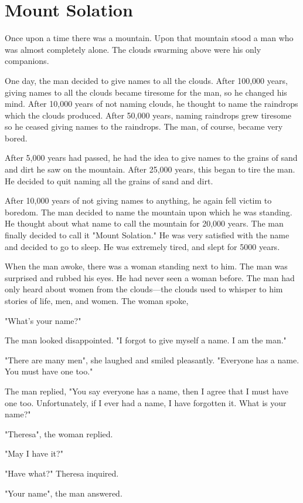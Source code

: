 \chapter{Mount Solation}

Once upon a time there was a mountain. Upon that mountain stood a man who was almost completely alone. The clouds swarming above were his only companions.

One day, the man decided to give names to all the clouds. After 100,000 years, giving names to all the clouds became tiresome for the man, so he changed his mind. After 10,000 years of not naming clouds, he thought to name the raindrops which the clouds produced. After 50,000 years, naming raindrops grew tiresome so he ceased giving names to the raindrops. The man, of course, became very bored.

After 5,000 years had passed, he had the idea to give names to the grains of sand and dirt he saw on the mountain. After 25,000 years, this began to tire the man. He decided to quit naming all the grains of sand and dirt.

After 10,000 years of not giving names to anything, he again fell victim to boredom. The man decided to name the mountain upon which he was standing. He thought about what name to call the mountain for 20,000 years. The man finally decided to call it "Mount Solation." He was very satisfied with the name and decided to go to sleep. He was extremely tired, and slept for 5000 years.

When the man awoke, there was a woman standing next to him. The man was surprised and rubbed his eyes. He had never seen a woman before. The man had only heard about women from the clouds—the clouds used to whisper to him stories of life, men, and women. The woman spoke,

"What's your name?"

The man looked disappointed. "I forgot to give myself a name. I am the man."

"There are many men", she laughed and smiled pleasantly. "Everyone has a name. You must have one too."

The man replied, "You say everyone has a name, then I agree that I must have one too. Unfortunately, if I ever had a name, I have forgotten it. What is your name?"

"Theresa", the woman replied.

"May I have it?"

"Have what?" Theresa inquired.

"Your name", the man answered.

